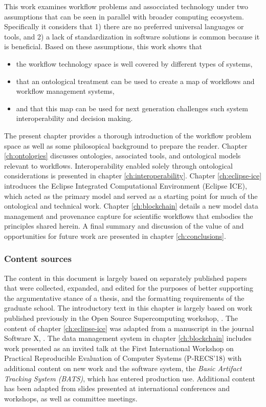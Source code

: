 This work examines workflow problems and assocciated technology under two
assumptions that can be seen in parallel with broader
computing ecosystem. Specifically it considers that 1) there are no preferred
universal languages or tools, and 2) a lack of standardization
in software solutions is common because it is beneficial. Based
on these assumptions, this work shows that 
\begin{itemize}
  \item the workflow technology space is well covered by different types
  of systems,
  \item that an ontological treatment can be used to create a map of
  workflows and workflow management systems,
  \item and that this map can be used for next generation
  challenges such system interoperability and decision making.
\end{itemize}

The present chapter provides a thorough introduction of the workflow problem
space as well as some philosopical background to prepare the reader. Chapter
\ref{ch:ontologies} discusses ontologies, associated tools, and ontological
models relevant to workflows. Interoperability enabled solely through
ontological considerations is presented in chapter
\ref{ch:interoperability}. Chapter \ref{ch:eclipse-ice} introduces the
Eclipse Integrated Computational Environment (Eclipse ICE), which acted as the
primary model and served as a starting point for much of the
ontological and technical work. Chapter \ref{ch:blockchain} details a new model
data management and provenance capture for scientific workflows that embodies
the principles shared herein. A final summary and discussion of the
value of and opportunities for future work are presented in chapter
\ref{ch:conclusions}.

\subsubsection{Content sources}

The content in this document is largely based on separately published papers
that were collected, expanded, and edited for the purposes of better supporting
the argumentative stance of a thesis, and the formatting requirements of
the graduate school. The introductory text in this chapter is largely based on
work published previously in the Open Source Supercomputing workshop,
\cite{billings_toward_2017}. The content of chapter \ref{ch:eclipse-ice} was
adapted from a manuscript in the journal Software X,
\cite{billings_eclipse_2017}. The data management system in chapter
\ref{ch:blockchain} includes work presented as an invited talk at the First
International Workshop on Practical Reproducible Evaluation of Computer Systems
(P-RECS'18) with additional content on new work and the software system, the
\textit{Basic Artifact Tracking System (BATS)}, which has entered production
use. Additional content has been adapted from slides presented at international
conferences and workshops, as well as committee meetings.

